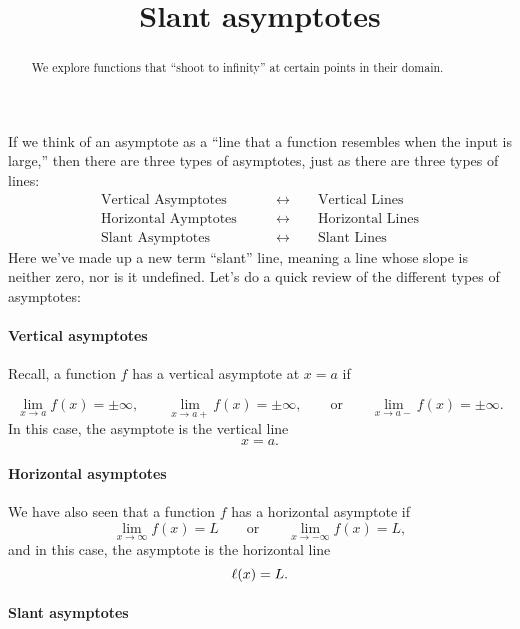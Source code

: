 \documentclass{ximera}
\title[Dig-In:]{Slant asymptotes}
\begin{document}
\begin{abstract}
We explore functions that ``shoot to infinity'' at certain points in
their domain.
\end{abstract}
\maketitle

If we think of an asymptote as a ``line that a function resembles when
the input is large,'' then there are three types of asymptotes, just
as there are three types of lines:
\begin{align*}
  \text{Vertical Asymptotes} \qquad&\leftrightarrow\qquad \text{Vertical Lines}\\
  \text{Horizontal Aymptotes}\qquad&\leftrightarrow\qquad \text{Horizontal Lines} \\
  \text{Slant Asymptotes}\qquad&\leftrightarrow\qquad \text{Slant Lines} 
\end{align*}
Here we've made up a new term ``slant'' line, meaning a line whose
slope is neither zero, nor is it undefined. Let's do a quick review of
the different types of asymptotes:



\paragraph{Vertical asymptotes}

Recall, a function $f$ has a vertical asymptote at $x=a$ if

\[
\lim_{x\to a} f(x) = \pm\infty, \qquad \lim_{x\to a+} f(x) = \pm\infty, \qquad\text{or}\qquad \lim_{x\to a-} f(x) = \pm\infty.
\]
In this case, the asymptote is the vertical line
\[
x = a.
\]



\paragraph{Horizontal asymptotes}

We have also seen that a function $f$ has a horizontal asymptote if
\[
\lim_{x\to \infty} f(x) = L \qquad\text{or}\qquad \lim_{x\to -\infty}
f(x) = L,
\]
and in this case, the asymptote is the horizontal line
\[
\ell(x) = L.
\]



\paragraph{Slant asymptotes}
\end{document}
